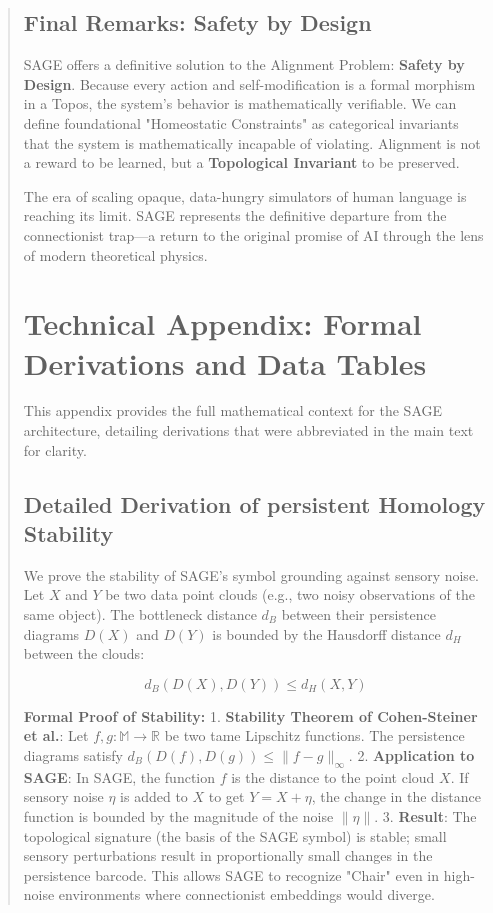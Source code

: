 \documentclass[10pt,twocolumn,letterpaper]{article}
\begin{document}
\begin{abstract}
\subsection{Final Remarks: Safety by Design}
SAGE offers a definitive solution to the Alignment Problem: \textbf{Safety by Design}. Because every action and self-modification is a formal morphism in a Topos, the system's behavior is mathematically verifiable. We can define foundational "Homeostatic Constraints" as categorical invariants that the system is mathematically incapable of violating. Alignment is not a reward to be learned, but a \textbf{Topological Invariant} to be preserved. 

The era of scaling opaque, data-hungry simulators of human language is reaching its limit. SAGE represents the definitive departure from the connectionist trap—a return to the original promise of AI through the lens of modern theoretical physics.


\section{Technical Appendix: Formal Derivations and Data Tables}

This appendix provides the full mathematical context for the SAGE architecture, detailing derivations that were abbreviated in the main text for clarity.

\subsection{Detailed Derivation of persistent Homology Stability}

We prove the stability of SAGE's symbol grounding against sensory noise. Let $X$ and $Y$ be two data point clouds (e.g., two noisy observations of the same object). The bottleneck distance $d_B$ between their persistence diagrams $D(X)$ and $D(Y)$ is bounded by the Hausdorff distance $d_H$ between the clouds:

$$ d_B(D(X), D(Y)) \le d_H(X, Y) $$

\textbf{Formal Proof of Stability:}
1.  \textbf{Stability Theorem of Cohen-Steiner et al.}: Let $f, g: \mathbb{M} \to \mathbb{R}$ be two tame Lipschitz functions. The persistence diagrams satisfy $d_B(D(f), D(g)) \le \|f - g\|_\infty$.
2.  \textbf{Application to SAGE}: In SAGE, the function $f$ is the distance to the point cloud $X$. If sensory noise $\eta$ is added to $X$ to get $Y = X + \eta$, the change in the distance function is bounded by the magnitude of the noise $\|\eta\|$.
3.  \textbf{Result}: The topological signature (the basis of the SAGE symbol) is stable; small sensory perturbations result in proportionally small changes in the persistence barcode. This allows SAGE to recognize "Chair" even in high-noise environments where connectionist embeddings would diverge.


\end{abstract}
\end{document}

